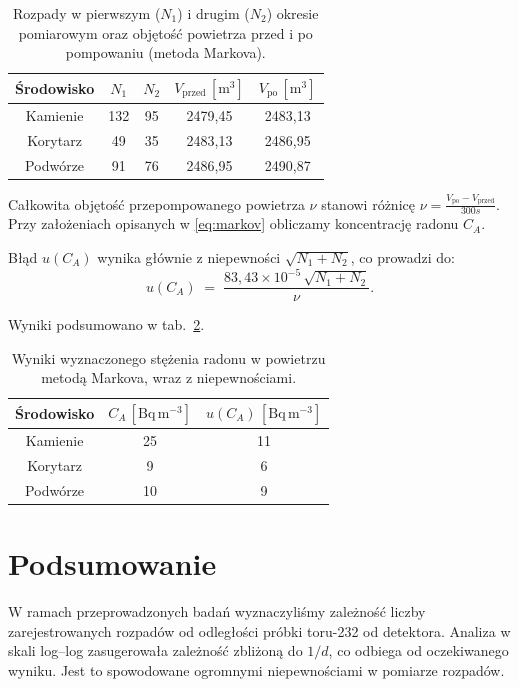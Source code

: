 \documentclass[12pt]{article}
\begin{document}
\begin{table}[H]
	\centering
	\begin{tabular}{c|cc|cc}
		\toprule
		Środowisko & $N_1$ & $N_2$ & $V_{\text{przed}}\,[\mathrm{m^3}]$ & $V_{\text{po}}\,[\mathrm{m^3}]$ \\
		\midrule
		Kamienie & 132 & 95 & 2479{,}45 & 2483{,}13 \\
		Korytarz & 49  & 35 & 2483{,}13 & 2486{,}95 \\
		Podwórze & 91  & 76 & 2486{,}95 & 2490{,}87 \\
		\bottomrule
	\end{tabular}
	\caption{Rozpady w pierwszym ($N_1$) i drugim ($N_2$) okresie pomiarowym oraz objętość powietrza przed i po pompowaniu (metoda Markova).}
	\label{tab:density_measurments}
\end{table}

Całkowita objętość przepompowanego powietrza \(\nu\) stanowi różnicę \(\nu=\frac{V_{\text{po}}-V_{\text{przed}}}{300s}\). Przy założeniach opisanych w \ref{eq:markov} obliczamy koncentrację radonu \(C_A\). 

Błąd \(u(C_A)\) wynika głównie z niepewności \(\sqrt{N_1 + N_2}\), co prowadzi do:
\[
	u(C_A) \;=\; \frac{83{,}43 \times 10^{-5}\,\sqrt{N_1 + N_2}}{\nu}.
\]

Wyniki podsumowano w tab.~\ref{tab:concentration_results}.

\begin{table}[H]
	\centering
	\begin{tabular}{c|cc}
		\toprule
		Środowisko & $C_A\,[\mathrm{Bq\,m^{-3}}]$ & $u(C_A)\,[\mathrm{Bq\,m^{-3}}]$ \\
		\midrule
		Kamienie  & 25 & 11 \\
		Korytarz  & 9  & 6  \\
		Podwórze  & 10 & 9  \\
		\bottomrule
	\end{tabular}
	\caption{Wyniki wyznaczonego stężenia radonu w powietrzu metodą Markova, wraz z niepewnościami.}
	\label{tab:concentration_results}
\end{table}

\section{Podsumowanie}
W ramach przeprowadzonych badań wyznaczyliśmy zależność liczby zarejestrowanych rozpadów od odległości próbki toru-232 od detektora. Analiza w skali log–log zasugerowała zależność zbliżoną do \(1/d\), co odbiega od oczekiwanego wyniku. Jest to spowodowane ogromnymi niepewnościami w pomiarze rozpadów.
\end{document}
